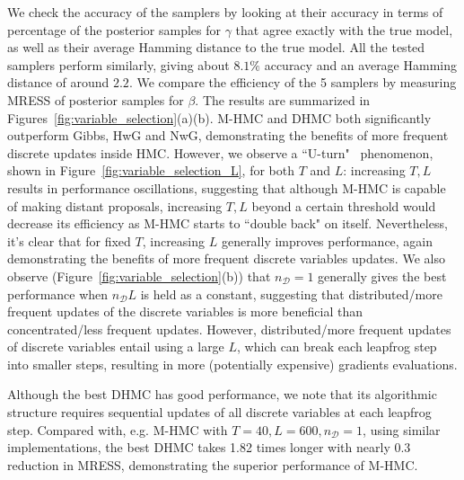 \documentclass{article}
\newcommand{\cald}{\mathcal{D}}
\begin{document}
We check the accuracy of the samplers by looking at their accuracy in terms of percentage of the posterior samples for $\gamma$ that agree exactly with the true model, as well as their average Hamming distance to the true model. All the tested samplers perform similarly, giving about $8.1\%$ accuracy and an average Hamming distance of around $2.2$.  We compare the efficiency of the 5 samplers by measuring MRESS of posterior samples for $\beta$. The results are summarized in Figures~\ref{fig:variable_selection}(a)(b). M-HMC and DHMC both significantly outperform Gibbs, HwG and NwG, demonstrating the benefits of more frequent discrete updates inside HMC. However, we observe a ``U-turn"~\cite{Hoffman2014-so} phenomenon, shown in Figure~\ref{fig:variable_selection_L}, for both $T$ and $L$: increasing $T, L$ results in performance oscillations, suggesting that although M-HMC is capable of making distant proposals, increasing $T, L$ beyond a certain threshold would decrease its efficiency as M-HMC starts to ``double back" on itself. Nevertheless, it's clear that for fixed $T$, increasing $L$ generally improves performance, again demonstrating the benefits of more frequent discrete variables updates. We also observe (Figure~\ref{fig:variable_selection}(b)) that $n_\cald=1$ generally gives the best performance when $n_\cald L$ is held as a constant, suggesting that distributed/more frequent updates of the discrete variables is more beneficial than concentrated/less frequent updates. However, distributed/more frequent updates of discrete variables entail using a large $L$, which can break each leapfrog step into smaller steps, resulting in more (potentially expensive) gradients evaluations.

Although the best DHMC has good performance, we note that its algorithmic structure requires sequential updates of all discrete variables at each leapfrog step. Compared with, e.g. M-HMC with $T=40, L=600, n_\cald=1$, using similar implementations, the best DHMC takes 1.82 times longer with nearly 0.3 reduction in MRESS, demonstrating the superior performance of M-HMC.
\end{document}
